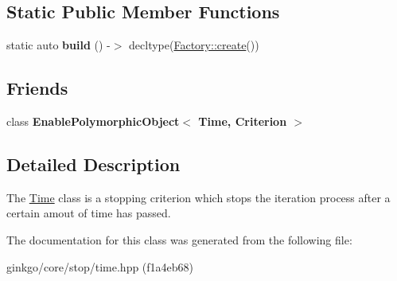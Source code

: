 \subsection*{Static Public Member Functions}
\begin{DoxyCompactItemize}
\item 
\mbox{\label{classgko_1_1stop_1_1Time_afeee63af790437143b6e607e73f41917}} 
static auto {\bfseries build} () -\/$>$ decltype(\hyperlink{classgko_1_1EnableDefaultFactory_a1d077101d9e788e6c65f088612d14cc3}{Factory\+::create}())
\end{DoxyCompactItemize}
\subsection*{Friends}
\begin{DoxyCompactItemize}
\item 
\mbox{\label{classgko_1_1stop_1_1Time_a0ad01ce3f53eb68b4841ead2a7bf5406}} 
class {\bfseries Enable\+Polymorphic\+Object$<$ Time, Criterion $>$}
\end{DoxyCompactItemize}


\subsection{Detailed Description}
The \hyperlink{classgko_1_1stop_1_1Time}{Time} class is a stopping criterion which stops the iteration process after a certain amout of time has passed. 

The documentation for this class was generated from the following file\+:\begin{DoxyCompactItemize}
\item 
ginkgo/core/stop/time.\+hpp (f1a4eb68)\end{DoxyCompactItemize}
